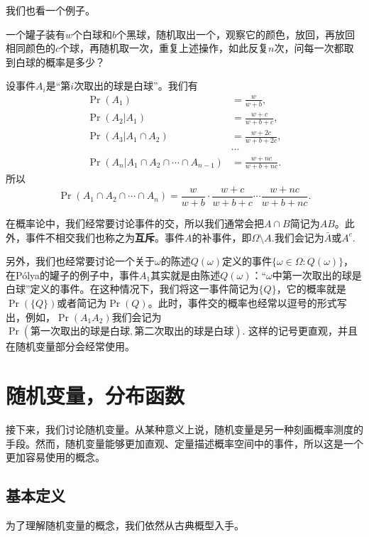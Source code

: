 我们也看一个例子。

\begin{example}[P\'olya的罐子]
    一个罐子装有$w$个白球和$b$个黑球，随机取出一个，观察它的颜色，放回，再放回相同颜色的$c$个球，再随机取一次，重复上述操作，如此反复$n$次，问每一次都取到白球的概率是多少？

    设事件$A_i$是“第$i$次取出的球是白球”。我们有
\begin{align*}
    \Pr(A_1)&=\frac{w}{w+b},\\
    \Pr(A_2|A_1)&=\frac{w+c}{w+b+c},\\
    \Pr(A_3|A_1\cap A_2)&=\frac{w+2c}{w+b+2c},\\
    &\cdots\\
    \Pr(A_n|A_1\cap A_2\cap\cdots\cap A_{n-1})&=\frac{w+nc}{w+b+nc}.
\end{align*}
    所以
\[
    \Pr(A_1\cap A_2\cap\cdots\cap A_n) = \frac{w}{w+b}\cdot\frac{w+c}{w+b+c}\cdots\frac{w+nc}{w+b+nc}.
\]
\end{example}

\begin{remark}
    在概率论中，我们经常要讨论事件的交，所以我们通常会把$A\cap B$简记为$AB$。此外，事件不相交我们也称之为\textbf{互斥}。事件$A$的补事件，即$\Omega\setminus A$.我们会记为$\bar{A}$或$A^c$.
    
    另外，我们也经常要讨论一个关于$\omega$的陈述$Q(\omega)$定义的事件$\{\omega\in\Omega:Q(\omega)\}$，在P\'olya的罐子的例子中，事件$A_1$其实就是由陈述$Q(\omega)$：“$\omega$中第一次取出的球是白球”定义的事件。在这种情况下，我们将这一事件简记为$\{Q\}$，它的概率就是$\Pr(\{Q\})$或者简记为$\Pr(Q)$。此时，事件交的概率也经常以逗号的形式写出，例如，$\Pr(A_1A_2)$我们会记为$\Pr(\text{第一次取出的球是白球},\text{第二次取出的球是白球})$. 这样的记号更直观，并且在随机变量部分会经常使用。
\end{remark}
\section{随机变量，分布函数}\label{sec:random-variable}

接下来，我们讨论随机变量。从某种意义上说，随机变量是另一种刻画概率测度的手段。然而，随机变量能够更加直观、定量描述概率空间中的事件，所以这是一个更加容易使用的概念。

\subsection{基本定义}

为了理解随机变量的概念，我们依然从古典概型入手。

